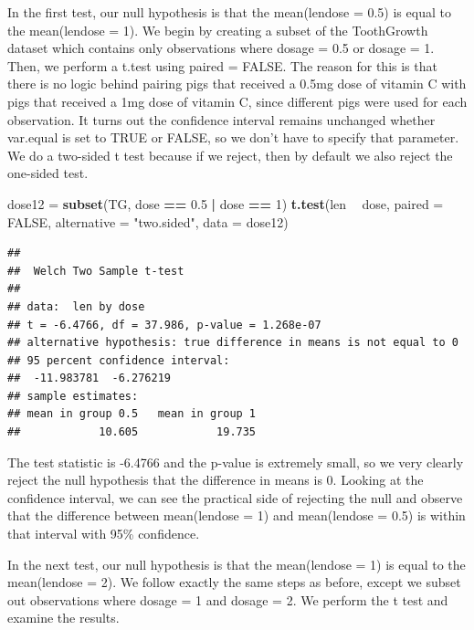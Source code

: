 \documentclass[
]{article}
\newenvironment{Shaded}{\begin{snugshade}}{\end{snugshade}}
\newcommand{\DataTypeTok}[1]{\textcolor[rgb]{0.13,0.29,0.53}{#1}}
\newcommand{\DecValTok}[1]{\textcolor[rgb]{0.00,0.00,0.81}{#1}}
\newcommand{\FloatTok}[1]{\textcolor[rgb]{0.00,0.00,0.81}{#1}}
\newcommand{\KeywordTok}[1]{\textcolor[rgb]{0.13,0.29,0.53}{\textbf{#1}}}
\newcommand{\NormalTok}[1]{#1}
\newcommand{\OperatorTok}[1]{\textcolor[rgb]{0.81,0.36,0.00}{\textbf{#1}}}
\newcommand{\OtherTok}[1]{\textcolor[rgb]{0.56,0.35,0.01}{#1}}
\newcommand{\StringTok}[1]{\textcolor[rgb]{0.31,0.60,0.02}{#1}}
\begin{document}
In the first test, our null hypothesis is that the mean(len\textbar dose
= 0.5) is equal to the mean(len\textbar dose = 1). We begin by creating
a subset of the ToothGrowth dataset which contains only observations
where dosage = 0.5 or dosage = 1. Then, we perform a t.test using paired
= FALSE. The reason for this is that there is no logic behind pairing
pigs that received a 0.5mg dose of vitamin C with pigs that received a
1mg dose of vitamin C, since different pigs were used for each
observation. It turns out the confidence interval remains unchanged
whether var.equal is set to TRUE or FALSE, so we don't have to specify
that parameter. We do a two-sided t test because if we reject, then by
default we also reject the one-sided test.

\begin{Shaded}
\begin{Highlighting}[]
\NormalTok{dose12 =}\StringTok{ }\KeywordTok{subset}\NormalTok{(TG, dose }\OperatorTok{==}\StringTok{ }\FloatTok{0.5} \OperatorTok{|}\StringTok{ }\NormalTok{dose }\OperatorTok{==}\StringTok{ }\DecValTok{1}\NormalTok{)}
\KeywordTok{t.test}\NormalTok{(len }\OperatorTok{~}\StringTok{ }\NormalTok{dose, }\DataTypeTok{paired =} \OtherTok{FALSE}\NormalTok{, }\DataTypeTok{alternative =} \StringTok{"two.sided"}\NormalTok{, }\DataTypeTok{data =}\NormalTok{ dose12)}
\end{Highlighting}
\end{Shaded}

\begin{verbatim}
## 
##  Welch Two Sample t-test
## 
## data:  len by dose
## t = -6.4766, df = 37.986, p-value = 1.268e-07
## alternative hypothesis: true difference in means is not equal to 0
## 95 percent confidence interval:
##  -11.983781  -6.276219
## sample estimates:
## mean in group 0.5   mean in group 1 
##            10.605            19.735
\end{verbatim}

The test statistic is -6.4766 and the p-value is extremely small, so we
very clearly reject the null hypothesis that the difference in means is
0. Looking at the confidence interval, we can see the practical side of
rejecting the null and observe that the difference between
mean(len\textbar dose = 1) and mean(len\textbar dose = 0.5) is within
that interval with 95\% confidence.

In the next test, our null hypothesis is that the mean(len\textbar dose
= 1) is equal to the mean(len\textbar dose = 2). We follow exactly the
same steps as before, except we subset out observations where dosage = 1
and dosage = 2. We perform the t test and examine the results.
\end{document}
